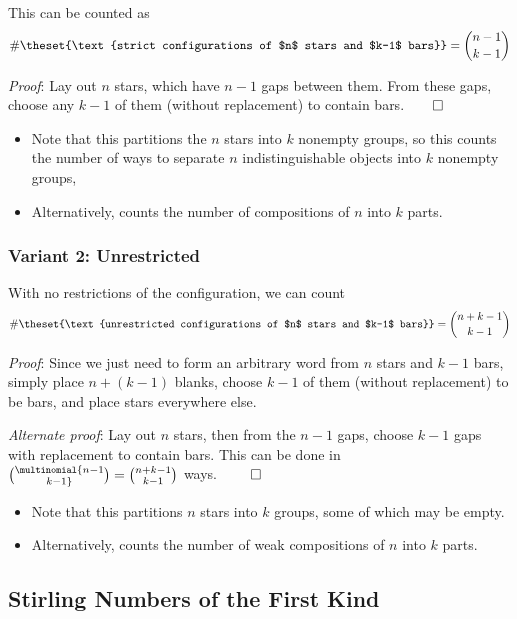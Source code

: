 This can be counted as \[
\#\theset{\text{strict configurations of $n$ stars and $k-1$ bars}} = {n-1 \choose k-1}
\]

\emph{Proof}: Lay out \(n\) stars, which have \(n-1\) gaps between them.
From these gaps, choose any \(k-1\) of them (without replacement) to
contain bars.\(\qed\)

\begin{itemize}
\tightlist
\item
  Note that this partitions the \(n\) stars into \(k\) nonempty groups,
  so this counts the number of ways to separate \(n\) indistinguishable
  objects into \(k\) nonempty groups,
\item
  Alternatively, counts the number of compositions of \(n\) into \(k\)
  parts.
\end{itemize}

\hypertarget{variant-2-unrestricted}{%
\subsubsection{Variant 2: Unrestricted}\label{variant-2-unrestricted}}

With no restrictions of the configuration, we can count \[
\#\theset{\text{unrestricted configurations of $n$ stars and $k-1$ bars}} = {n+k-1 \choose k-1}
\]

\emph{Proof}: Since we just need to form an arbitrary word from \(n\)
stars and \(k-1\) bars, simply place \(n + (k-1)\) blanks, choose
\(k-1\) of them (without replacement) to be bars, and place stars
everywhere else.

\emph{Alternate proof}: Lay out \(n\) stars, then from the \(n-1\) gaps,
choose \(k-1\) gaps with replacement to contain bars. This can be done
in \(\multinomial{n-1 \choose k-1} = {n+k-1 \choose k-1}\) ways.
\(\qed\)

\begin{itemize}
\tightlist
\item
  Note that this partitions \(n\) stars into \(k\) groups, some of which
  may be empty.
\item
  Alternatively, counts the number of weak compositions of \(n\) into
  \(k\) parts.
\end{itemize}

\hypertarget{stirling-numbers-of-the-first-kind}{%
\subsection{Stirling Numbers of the First
Kind}\label{stirling-numbers-of-the-first-kind}}

